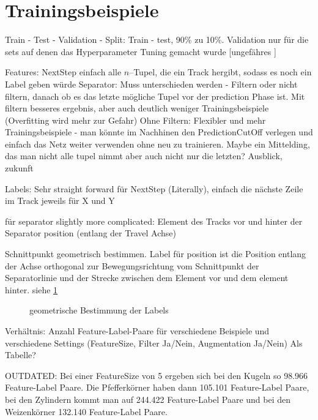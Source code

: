 \color{black}
\section{Trainingsbeispiele}

Train - Test - Validation - Split:
Train - test, 90\% zu 10\%.
Validation nur für die sets auf denen das Hyperparameter Tuning gemacht wurde
[ungefähres ]


Features:
NextStep einfach alle \(n\)--Tupel, die ein Track hergibt, sodass es noch ein Label geben würde
Separator: Muss unterschieden werden - Filtern oder nicht filtern, danach ob es das letzte mögliche Tupel vor der prediction Phase ist.
Mit filtern besseres ergebnis, aber auch deutlich weniger Trainingsbeispiele (Overfitting wird mehr zur Gefahr)
Ohne Filtern: Flexibler und mehr Trainingsbeispiele - man könnte im Nachhinen den PredictionCutOff verlegen 
und einfach das Netz weiter verwenden ohne neu zu trainieren.
Maybe ein Mittelding, das man nicht alle tupel nimmt aber auch nicht nur die letzten? Ausblick, zukunft


Labels:
Sehr straight forward für NextStep (Literally), einfach die nächste Zeile im Track jeweils für X und Y

für separator slightly more complicated: 
Element des Tracks vor und hinter der Separator position (entlang der Travel Achse)

Schnittpunkt geometrisch bestimmen.
Label für position ist die Position entlang der Achse orthogonal zur Bewegungsrichtung vom Schnittpunkt der Separatorlinie und 
der Strecke zwischen dem Element vor und dem element hinter. siehe \ref{fig:Schnittpunkt}


\begin{figure}
	\caption{geometrische Bestimmung der Labels}
	\label{fig:Schnittpunkt}
\end{figure}


Verhältnis: Anzahl Feature-Label-Paare für verschiedene Beispiele und verschiedene Settings
(FeatureSize, Filter Ja/Nein, Augmentation Ja/Nein) Als Tabelle?

OUTDATED:
Bei einer FeatureSize von 5 ergeben sich bei den Kugeln so 98.966 Feature-Label Paare.
Die Pfefferkörner haben dann 105.101 Feature-Label Paare,
bei den Zylindern kommt man auf 244.422 Feature-Label Paare
und bei den Weizenkörner 132.140 Feature-Label Paare.

